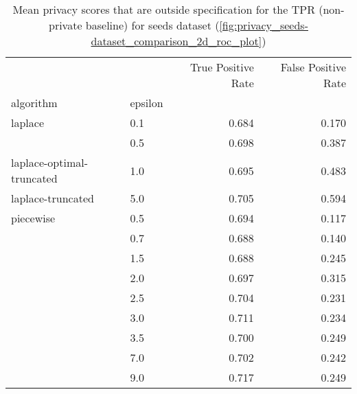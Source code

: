 \begin{table}[H]
    \begin{tabularx}{.8\textwidth}{llrr}
        \toprule
                                  &         & True Positive Rate & False Positive Rate \\
        algorithm                 & epsilon &                    &                     \\
        \midrule
        laplace                   & 0.1     & 0.684              & 0.170               \\
                                  & 0.5     & 0.698              & 0.387               \\
        laplace-optimal-truncated & 1.0     & 0.695              & 0.483               \\
        laplace-truncated         & 5.0     & 0.705              & 0.594               \\
        piecewise                 & 0.5     & 0.694              & 0.117               \\
                                  & 0.7     & 0.688              & 0.140               \\
                                  & 1.5     & 0.688              & 0.245               \\
                                  & 2.0     & 0.697              & 0.315               \\
                                  & 2.5     & 0.704              & 0.231               \\
                                  & 3.0     & 0.711              & 0.234               \\
                                  & 3.5     & 0.700              & 0.249               \\
                                  & 7.0     & 0.702              & 0.242               \\
                                  & 9.0     & 0.717              & 0.249               \\
        \bottomrule
    \end{tabularx}
    \caption{Mean privacy scores that are outside specification for the TPR (non-private baseline) for seeds dataset (\ref{fig:privacy_seeds-dataset_comparison_2d_roc_plot})}

\end{table}